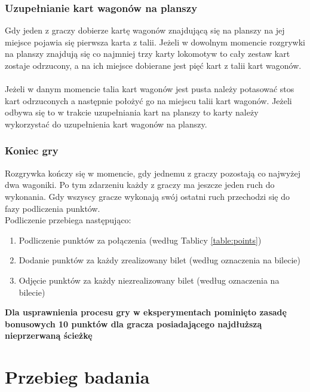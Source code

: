 \documentclass[12pt, oneside]{report}
\begin{document}
	\subsection{Uzupełnianie kart wagonów na planszy}
	Gdy jeden z graczy dobierze kartę wagonów znajdującą się na planszy na jej miejsce pojawia się pierwsza karta z talii. Jeżeli w dowolnym momencie rozgrywki na planszy znajdują się co najmniej trzy karty lokomotyw to cały zestaw kart zostaje odrzucony, a na ich miejsce dobierane jest pięć kart z talii kart wagonów. \\ \\
	Jeżeli w danym momencie talia kart wagonów jest pusta należy potasować stos kart odrzuconych a następnie położyć go na miejscu talii kart wagonów. Jeżeli odbywa się to w trakcie uzupełniania kart na planszy to karty należy wykorzystać do uzupełnienia kart wagonów na planszy. 
	\subsection{Koniec gry}
	Rozgrywka kończy się w momencie, gdy jednemu z graczy pozostają co najwyżej dwa wagoniki. Po tym zdarzeniu każdy z graczy ma jeszcze jeden ruch do wykonania. Gdy wszyscy gracze wykonają swój ostatni ruch przechodzi się do fazy podliczenia punktów. \\
	Podliczenie przebiega następująco:
	\begin{enumerate}
		\item Podliczenie punktów za połączenia (według Tablicy \ref{table:points})
		\item Dodanie punktów za każdy zrealizowany bilet (według oznaczenia na bilecie)
		\item Odjęcie punktów za każdy niezrealizowany bilet (według oznaczenia na bilecie)
	\end{enumerate}
	\textbf{Dla usprawnienia procesu gry w eksperymentach pominięto zasadę bonusowych 10 punktów dla gracza posiadającego najdłuższą nieprzerwaną ścieżkę}
	\chapter{Przebieg badania}
\end{document}

